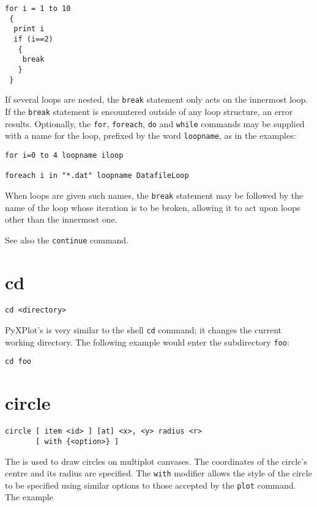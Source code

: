 \begin{verbatim}
for i = 1 to 10
 {
  print i
  if (i==2)
   {
    break
   }
 }
\end{verbatim}

If several loops are nested, the {\tt break} statement only acts on the
innermost loop. If the {\tt break} statement is encountered outside of any loop
structure, an error results. Optionally, the {\tt for}, {\tt foreach}, {\tt do}
and {\tt while} commands may be supplied with a name for the loop, prefixed by
the word {\tt loopname}, as in the examples:

\begin{verbatim}
for i=0 to 4 loopname iloop

foreach i in "*.dat" loopname DatafileLoop
\end{verbatim}

\noindent When loops are given such names, the {\tt break} statement may be
followed by the name of the loop whose iteration is to be broken, allowing it
to act upon loops other than the innermost one.

See also the {\tt continue} command.


\section{cd}

\begin{verbatim}
cd <directory>
\end{verbatim}

PyXPlot's  is very similar to the shell {\tt cd} command; it
changes the current working directory. The following example would enter the
subdirectory {\tt foo}:

\begin{verbatim}
cd foo
\end{verbatim}


\section{circle}

\begin{verbatim}
circle [ item <id> ] [at] <x>, <y> radius <r>
       [ with {<option>} ]
\end{verbatim}

The  is used to draw circles on multiplot canvases.  The
coordinates of the circle's centre and its radius are specified. The {\tt with}
modifier allows the style of the circle to be specified using similar options
to those accepted by the {\tt plot} command.  The example

